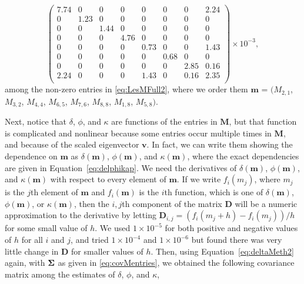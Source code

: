 \documentclass[]{risa}\usepackage[]{graphicx}\usepackage[]{color}
\def\bm{\mathbf{m}}
\def\bv{\mathbf{v}}
\def\bD{\mathbf{D}}
\def\bM{\mathbf{M}}
\def\bSigma{\mbox{\boldmath $\Sigma$}}
\begin{document}
\begin{equation} \label{eq:covMentries}
   \left( \begin{smallmatrix}
 7.74 & 0 & 0 & 0 & 0 & 0 & 0 & 2.24 \\ 
  0 & 1.23 & 0 & 0 & 0 & 0 & 0 & 0 \\ 
  0 & 0 & 1.44 & 0 & 0 & 0 & 0 & 0 \\ 
  0 & 0 & 0 & 4.76 & 0 & 0 & 0 & 0 \\ 
  0 & 0 & 0 & 0 & 0.73 & 0 & 0 & 1.43 \\ 
  0 & 0 & 0 & 0 & 0 & 0.68 & 0 & 0 \\ 
  0 & 0 & 0 & 0 & 0 & 0 & 2.85 & 0.16 \\ 
  2.24 & 0 & 0 & 0 & 1.43 & 0 & 0.16 & 2.35 \\ 
  \end{smallmatrix} \right) \times 10^{-3},
\end{equation}
among the non-zero entries in \ref{eq:LesMFull2}, where we order them $\bm$ = $(M_{2,1}$, $M_{3,2}$, $M_{4,4}$, $M_{6,5}$, $M_{7,6}$, $M_{8,8}$, $M_{1,8}$, $M_{5,8})$.

Next, notice that $\delta$, $\phi$, and $\kappa$ are functions of the entries in $\bM$, but that function is complicated and nonlinear because some entries occur multiple times in $\bM$, and because of the scaled eigenvector $\bv$. In fact, we can write them showing the dependence on $\bm$ as $\delta(\bm)$, $\phi(\bm)$, and $\kappa(\bm)$, where the exact dependencies are given in Equation~\ref{eq:delphikap}. We need the derivatives of $\delta(\bm)$, $\phi(\bm)$, and $\kappa(\bm)$ with respect to every element of $\bm$.  If we write $f_i(m_j)$, where $m_j$ is the $j$th element of $\bm$ and $f_i(\bm)$ is the $i$th function, which is one of $\delta(\bm)$, $\phi(\bm)$, or $\kappa(\bm)$, then the $i,j$th component of the matrix $\bD$ will be a numeric approximation to the derivative by letting $\bD_{i,j} = (f_i(m_j + h) - f_i(m_j))/h$ for some small value of $h$.  We used $1 \times 10^{-5}$ for both positive and negative values of $h$ for all $i$ and $j$, and tried $1 \times 10^{-4}$ and $1 \times 10^{-6}$ but found there was very little change in $\bD$ for smaller values of $h$.  Then, using Equation~\ref{eq:deltaMeth2} again, with $\bSigma$ as given in \ref{eq:covMentries}, we obtained the following covariance matrix among the estimates of $\delta$, $\phi$, and $\kappa$,
\end{document}
